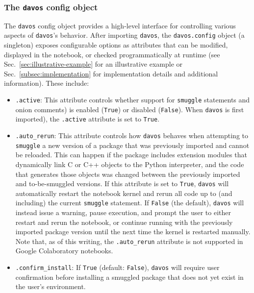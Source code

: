 \documentclass[preprint,12pt,a4paper]{elsarticle}
\begin{document}
\subsubsection{The \texttt{davos} config object}\label{subsec:config}

The \texttt{davos} config object provides a high-level interface for
controlling various aspects of \texttt{davos}'s behavior. After
importing \texttt{davos}, the \texttt{davos.con\-fig} object (a
singleton) exposes configurable options as attributes that can be
modified, displayed in the notebook, or checked programmatically at runtime 
(see Sec.~\ref{sec:illustrative-example} for an illustrative example or
Sec.~\ref{subsec:implementation} for implementation details and
additional information). These include:

\begin{itemize}
\item \texttt{.active}: This attribute controls whether support for \texttt{smuggle}
  statements and onion comments) is enabled (\texttt{True}) or
  disabled (\texttt{False}).  When \texttt{davos} is first imported),
  the \texttt{.active} attribute is set to \texttt{True}.
  
\item \texttt{.auto\_rerun}: This attribute controls how
  \texttt{davos} behaves when attempting to \texttt{smuggle} a new
  version of a package that was previously imported and cannot be
  reloaded. This can happen if the package includes extension modules
  that dynamically link C or C++ objects to the Python interpreter,
  and the code that generates those objects was changed between the
  previously imported and to-be-smuggled versions.  If this attribute
  is set to \texttt{True}, \texttt{davos} will automatically restart
  the notebook kernel and rerun all code up to (and including) the
  current \texttt{smuggle} statement. If \texttt{False} (the default),
  \texttt{davos} will instead issue a warning, pause execution, and
  prompt the user to either restart and rerun the notebook, or
  continue running with the previously imported package version until
  the next time the kernel is restarted manually.  Note that, as of
  this writing, the \texttt{.auto\_rerun} attribute is not supported
  in Google Colaboratory notebooks.
  
\item \texttt{.confirm\_install}: If \texttt{True} (default:
  \texttt{False}), \texttt{davos} will require user confirmation
  before installing a smuggled package that does not yet exist in the
  user's environment.
 

\end{itemize}
\end{document}
